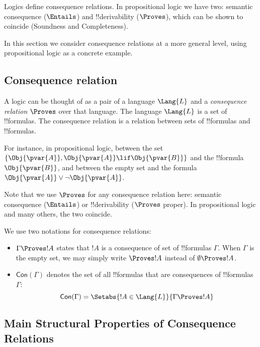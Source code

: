 \documentclass[../../../include/open-logic-section]{subfiles}
\begin{document}


Logics define consequence relations. In propositional logic we have
two: semantic consequence ($\Entails$) and !!{derivability} ($\Proves$),
which can be shown to coincide (Soundness and Completeness).

In this section we consider consequence relations at a more general
level, using propositional logic as a concrete example.

\subsection{Consequence relation}

A logic can be thought of as a pair of a language $\Lang{L}$ and 
a \emph{consequence relation} $\Proves$ over that language.
The language $\Lang{L}$  is a set of !!{formula}s. The consequence relation is a
relation between sets of !!{formula}s and !!{formula}s.

For instance, in propositional logic, between the set
$\{\Obj{\pvar{A}},\Obj{\pvar{A}}\lif\Obj{\pvar{B}}\}$ and the
!!{formula} $\Obj{\pvar{B}}$, and between the empty set and the
formula $\Obj{\pvar{A}}\lor\lnot\Obj{\pvar{A}}$. 

Note that we use $\Proves$ for any consequence relation here: semantic 
consequence ($\Entails$) or !!{derivability} ($\Proves$ proper). 
In propositional logic and many others, the two coincide. 

We use two notations for consequence relations:
\begin{itemize}
    \item $\Gamma\Proves !A$ states that $!A$ is a consequence of 
    set of !!{formula}s $\Gamma$. When $\Gamma$ is the empty set, 
    we may simply write $\Proves !A$ instead of
    $\emptyset\Proves !A$.

    \item $\mathsf{Con}(\Gamma)$ denotes the set of all !!{formula}s that
    are consequences of !!{formula}s $\Gamma$:
    $$\mathsf{Con}(\Gamma)=\Setabs{!A\in\Lang{L}}{\Gamma\Proves !A}$$

\end{itemize}

\subsection{Main Structural Properties of Consequence Relations}
\end{document}
